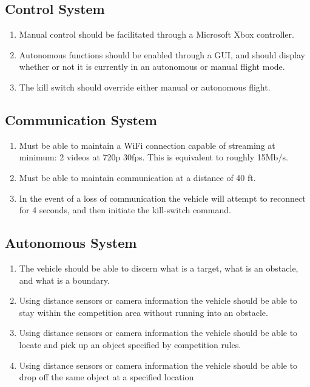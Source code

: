 \documentclass[onecolumn, draftclsnofoot,10pt, compsoc]{IEEEtran}
\begin{document}
\subsection{Control System}
\begin{enumerate}
\item Manual control should be facilitated through a Microsoft Xbox controller. 

\item Autonomous functions should be enabled through a GUI, and should display whether or not it is currently in an autonomous or manual flight mode. 

\item The kill switch should override either manual or autonomous flight.


\end{enumerate}
\subsection{Communication System}
\begin{enumerate}
\item Must be able to maintain a WiFi connection capable of streaming at minimum: 2 videos at 720p 30fps. This is equivalent to roughly 15Mb/s.

\item Must be able to maintain communication at a distance of 40 ft.

\item In the event of a loss of communication the vehicle will attempt to reconnect for 4 seconds, and then initiate the kill-switch command.


\end{enumerate}
\subsection{Autonomous System}
\begin{enumerate}
\item The vehicle should be able to discern what is a target, what is an obstacle, and what is a boundary.
\item Using distance sensors or camera information the vehicle should be able to stay within the competition area without running into an obstacle. 
\item Using distance sensors or camera information the vehicle should be able to locate and pick up an object specified by competition rules.
\item Using distance sensors or camera information the vehicle should be able to drop off the same object at a specified location


\end{enumerate}
\end{document}

